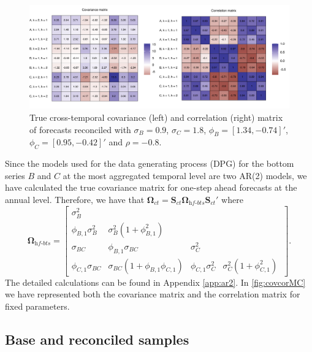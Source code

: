 \documentclass[a4paper,11pt]{article}
\newcommand{\Svet}{\bm{S}}
\newcommand{\Omegavet}{\bm{\Omega}}
\theoremstyle{definition}
\begin{document}
\begin{figure}[!t]
	\centering
	\includegraphics[width = \linewidth]{fig/simAR/covcor.pdf}
	\caption{True cross-temporal covariance (left) and correlation (right) matrix of forecasts reconciled with $\sigma_B = 0.9$, $\sigma_C = 1.8$, $\phi_B = [1.34, -0.74]'$, $\phi_C = [0.95, -0.42]'$ and $\rho = -0.8$.}
	\label{fig:covcorMC}
\end{figure}

Since the models used for the data generating process (DPG) for the bottom series $B$ and $C$ at the most aggregated temporal level are two AR(2) models, we have calculated the true covariance matrix for one-step ahead forecasts at the annual level. Therefore, we have that $\Omegavet_{ct} = \Svet_{ct}\Omegavet_{\textit{hf-bts}}\Svet_{ct}'$ where
$$
	\Omegavet_{\textit{hf-bts}} = \begin{bmatrix}
		\sigma^2_B            &                                                 &                      &                                        \\
		\phi_{B,1}\sigma_B^2  & \sigma_B^2\left(1+\phi_{B,1}^2\right)           &                      &                                        \\
		\sigma_{BC}           & \phi_{B,1}\sigma_{BC}                           & \sigma_C^2           &                                        \\
		\phi_{C,1}\sigma_{BC} & \sigma_{BC}\left(1+\phi_{B,1}\phi_{C,1} \right) & \phi_{C,1}\sigma_C^2 & \sigma_C^2\left(1+\phi_{C,1}^2\right)\
	\end{bmatrix}.
$$
The detailed calculations can be found in Appendix \ref{app:ar2}.
In \autoref{fig:covcorMC} we have represented both the covariance matrix and the correlation matrix for fixed parameters.

\subsection{Base and reconciled samples}\label{ssec:sim_br}
\end{document}
